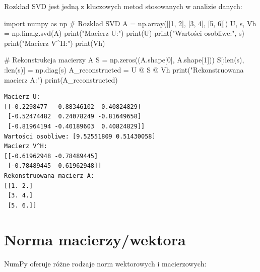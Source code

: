 \documentclass[
  polish,
  letterpaper,
  DIV=11,
  numbers=noendperiod]{scrreprt}
\newenvironment{Shaded}{\begin{snugshade}}{\end{snugshade}}
\newcommand{\BuiltInTok}[1]{\textcolor[rgb]{0.00,0.23,0.31}{#1}}
\newcommand{\CommentTok}[1]{\textcolor[rgb]{0.37,0.37,0.37}{#1}}
\newcommand{\DecValTok}[1]{\textcolor[rgb]{0.68,0.00,0.00}{#1}}
\newcommand{\ImportTok}[1]{\textcolor[rgb]{0.00,0.46,0.62}{#1}}
\newcommand{\NormalTok}[1]{\textcolor[rgb]{0.00,0.23,0.31}{#1}}
\newcommand{\OperatorTok}[1]{\textcolor[rgb]{0.37,0.37,0.37}{#1}}
\newcommand{\StringTok}[1]{\textcolor[rgb]{0.13,0.47,0.30}{#1}}
\begin{document}
Rozkład SVD jest jedną z kluczowych metod stosowanych w analizie danych:

\begin{Shaded}
\begin{Highlighting}[]
\ImportTok{import}\NormalTok{ numpy }\ImportTok{as}\NormalTok{ np}
\CommentTok{\# Rozkład SVD}
\NormalTok{A }\OperatorTok{=}\NormalTok{ np.array([[}\DecValTok{1}\NormalTok{, }\DecValTok{2}\NormalTok{], [}\DecValTok{3}\NormalTok{, }\DecValTok{4}\NormalTok{], [}\DecValTok{5}\NormalTok{, }\DecValTok{6}\NormalTok{]])}
\NormalTok{U, s, Vh }\OperatorTok{=}\NormalTok{ np.linalg.svd(A)}
\BuiltInTok{print}\NormalTok{(}\StringTok{"Macierz U:"}\NormalTok{)}
\BuiltInTok{print}\NormalTok{(U)}
\BuiltInTok{print}\NormalTok{(}\StringTok{"Wartości osobliwe:"}\NormalTok{, s)}
\BuiltInTok{print}\NormalTok{(}\StringTok{"Macierz V\^{}H:"}\NormalTok{)}
\BuiltInTok{print}\NormalTok{(Vh)}

\CommentTok{\# Rekonstrukcja macierzy A}
\NormalTok{S }\OperatorTok{=}\NormalTok{ np.zeros((A.shape[}\DecValTok{0}\NormalTok{], A.shape[}\DecValTok{1}\NormalTok{]))}
\NormalTok{S[:}\BuiltInTok{len}\NormalTok{(s), :}\BuiltInTok{len}\NormalTok{(s)] }\OperatorTok{=}\NormalTok{ np.diag(s)}
\NormalTok{A\_reconstructed }\OperatorTok{=}\NormalTok{ U }\OperatorTok{@}\NormalTok{ S }\OperatorTok{@}\NormalTok{ Vh}
\BuiltInTok{print}\NormalTok{(}\StringTok{"Rekonstruowana macierz A:"}\NormalTok{)}
\BuiltInTok{print}\NormalTok{(A\_reconstructed)}
\end{Highlighting}
\end{Shaded}

\begin{verbatim}
Macierz U:
[[-0.2298477   0.88346102  0.40824829]
 [-0.52474482  0.24078249 -0.81649658]
 [-0.81964194 -0.40189603  0.40824829]]
Wartości osobliwe: [9.52551809 0.51430058]
Macierz V^H:
[[-0.61962948 -0.78489445]
 [-0.78489445  0.61962948]]
Rekonstruowana macierz A:
[[1. 2.]
 [3. 4.]
 [5. 6.]]
\end{verbatim}

\section{Norma macierzy/wektora}\label{norma-macierzywektora}

NumPy oferuje różne rodzaje norm wektorowych i macierzowych:
\end{document}
